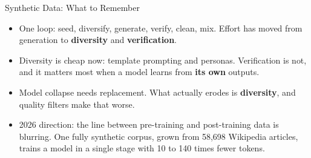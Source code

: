 \begin{frame}{Synthetic Data: What to Remember}
    \begin{itemize}\itemsep0.6em
        \item One loop: seed, diversify, generate, verify, clean, mix. Effort has moved from generation to \textbf{diversity} and \textbf{verification}.
        \item Diversity is cheap now: template prompting and personas. Verification is not, and it matters most when a model learns from \textbf{its own} outputs.
        \item Model collapse needs replacement. What actually erodes is \textbf{diversity}, and quality filters make that worse.
        \item 2026 direction: the line between pre-training and post-training data is blurring. One fully synthetic corpus, grown from 58,698 Wikipedia articles, trains a model in a single stage with 10 to 140 times fewer tokens.
    \end{itemize}
    \vspace{0.3em}
\end{frame}
